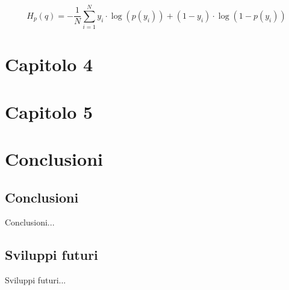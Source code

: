 \documentclass[12pt,italian]{report}
\begin{document}
$$
H_p(q) = -\frac{1}{N} \sum_{i=1}^N y_i \cdot \log(p(y_i)) + (1-y_i) \cdot \log(1-p(y_i))
$$

% 
% 

\chapter{Capitolo 4}
\label{chap:datasets}


% 
% 

\chapter{Capitolo 5}
\label{chap:risultati}


% 
% 

\chapter{Conclusioni}
\label{cap6}

\section{Conclusioni}

Conclusioni...

\section{Sviluppi futuri}

Sviluppi futuri...



%
%



\end{document}
